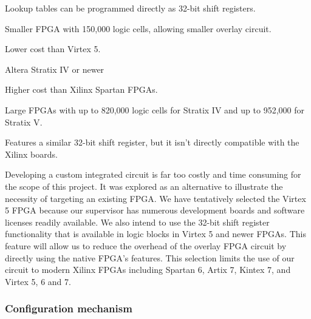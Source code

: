 \begin{enumeration}
\begin{itemlist}
\begin{enumeration}
\begin{itemlist}
					\item Lookup tables can be programmed directly as 32-bit shift registers.
					\item Smaller FPGA with 150,000 logic cells\cite{xilinx-models}, allowing smaller overlay circuit.
					\item Lower cost than Virtex 5.
				\end{itemlist}
			\item Altera Stratix IV or newer
				\begin{itemlist}
					\item Higher cost than Xilinx Spartan FPGAs.
					\item Large FPGAs with up to 820,000 logic cells for Stratix IV\cite{altera-stratix4} and up to 952,000 for Stratix V\cite{altera-stratix5}.
					\item Features a similar 32-bit shift register, but it isn't directly compatible with the Xilinx boards.
				\end{itemlist}
		\end{enumeration}
	\end{itemlist}
\end{enumeration}

Developing a custom integrated circuit is far too costly and time consuming for the scope of this project.
It was explored as an alternative to illustrate the necessity of targeting an existing FPGA.
We have tentatively selected the Virtex 5 FPGA because our supervisor has numerous development boards and software licenses readily available.
We also intend to use the 32-bit shift register functionality that is available in logic blocks in Virtex 5 and newer FPGAs.
This feature will allow us to reduce the overhead of the overlay FPGA circuit by directly using the native FPGA's features.
This selection limits the use of our circuit to modern Xilinx FPGAs including Spartan 6, Artix 7, Kintex 7, and Virtex 5, 6 and 7.



\subsubsection{Configuration mechanism}

